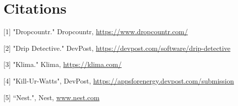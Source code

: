 \documentclass[10pt]{article}
\begin{document}
\section{Citations}
[1] "Dropcountr." Dropcountr, \href{https://www.dropcountr.com/}{https://www.dropcountr.com/}

[2] "Drip Detective." DevPost, \href{https://devpost.com/software/drip-detective}{https://devpost.com/software/drip-detective}

[3] "Klima." Klima, \href{https://klima.com/}{https://klima.com/}

[4] "Kill-Ur-Watts", DevPost, \href{https://appsforenergy.devpost.com/submission}{https://appsforenergy.devpost.com/submission}

[5] “Nest.", Nest, \href{http://www.nest.com}{www.nest.com}
\end{document}
